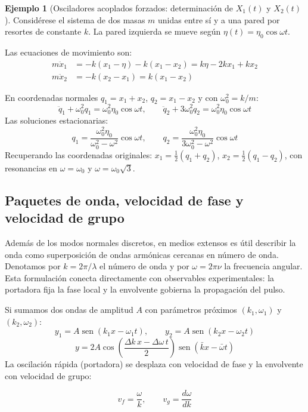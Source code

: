 \documentclass[12pt, a4paper]{article}
\theoremstyle{plain}
\theoremstyle{definition}
\newtheorem{ejemplo}{Ejemplo}[section]
\theoremstyle{remark}
\DeclareMathOperator{\sen}{sen}
\begin{document}
\begin{ejemplo}[Osciladores acoplados forzados: determinación de \texorpdfstring{$X_1(t)$}{X1} y \texorpdfstring{$X_2(t)$}{X2}]
Considérese el sistema de dos masas $m$ unidas entre sí y a una pared por resortes de
constante $k$. La pared izquierda se mueve según $\eta(t) = \eta_0\cos\omega t$.

Las ecuaciones de movimiento son:
\begin{align}
  m\ddot{x}_1 &= -k(x_1 - \eta) - k(x_1-x_2) = k\eta - 2kx_1 + kx_2 \\
  m\ddot{x}_2 &= -k(x_2 - x_1) = k(x_1-x_2)
\end{align}

En coordenadas normales $q_1 = x_1+x_2$, $q_2 = x_1-x_2$ y con $\omega_0^2 = k/m$:
\begin{equation}
  \ddot{q}_1 + \omega_0^2 q_1 = \omega_0^2\eta_0\cos\omega t,\qquad
  \ddot{q}_2 + 3\omega_0^2 q_2 = \omega_0^2\eta_0\cos\omega t
\end{equation}
Las soluciones estacionarias:
\begin{equation}
  q_1 = \frac{\omega_0^2\eta_0}{\omega_0^2-\omega^2}\cos\omega t,\qquad
  q_2 = \frac{\omega_0^2\eta_0}{3\omega_0^2-\omega^2}\cos\omega t
\end{equation}
Recuperando las coordenadas originales: $x_1 = \frac{1}{2}(q_1+q_2)$,
$x_2 = \frac{1}{2}(q_1-q_2)$, con resonancias en $\omega = \omega_0$ y
$\omega = \omega_0\sqrt{3}$.
\end{ejemplo}

\subsection{Paquetes de onda, velocidad de fase y velocidad de grupo}

Además de los modos normales discretos, en medios extensos es útil describir la onda como
superposición de ondas armónicas cercanas en número de onda. Denotamos por
$k=2\pi/\lambda$ el número de onda y por $\omega=2\pi\nu$ la frecuencia angular.
Esta formulación conecta directamente con observables experimentales: la portadora fija la
fase local y la envolvente gobierna la propagación del pulso.

Si sumamos dos ondas de amplitud $A$ con parámetros próximos $(k_1,\omega_1)$ y
$(k_2,\omega_2)$:
\begin{equation}
  y_1=A\sen(k_1x-\omega_1 t),\qquad y_2=A\sen(k_2x-\omega_2 t)
\end{equation}
\begin{equation}
  y=2A\cos\!\left(\frac{\Delta k\,x-\Delta\omega\,t}{2}\right)
    \sen\!\left(\bar{k}x-\bar{\omega}t\right)
\end{equation}
La oscilación rápida (portadora) se desplaza con velocidad de fase y la envolvente con
velocidad de grupo:
\begin{mdframed}[style=resultado]
\begin{equation}
  v_f=\frac{\omega}{k},\qquad
  v_g=\frac{d\omega}{dk}
\end{equation}
\end{mdframed}
\end{document}
